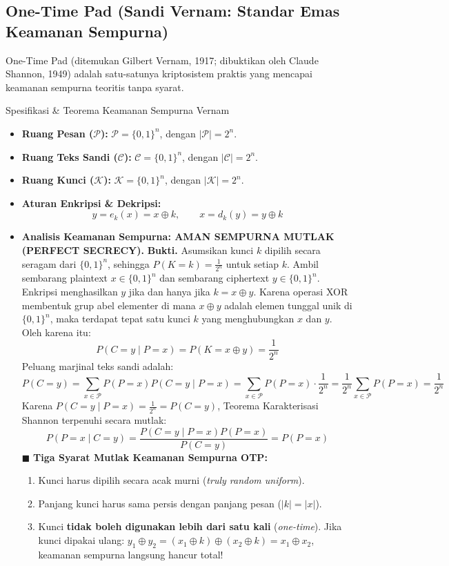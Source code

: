 \documentclass[11pt,a4paper]{article}
\newenvironment{proof}{\noindent\textbf{Bukti.}}{\hfill$\blacksquare$\vspace{0.3em}}
\begin{document}
\subsection{One-Time Pad (Sandi Vernam: Standar Emas Keamanan Sempurna)}
One-Time Pad (ditemukan Gilbert Vernam, 1917; dibuktikan oleh Claude Shannon, 1949) adalah satu-satunya kriptosistem praktis yang mencapai keamanan sempurna teoritis tanpa syarat.
\begin{thmbox}{Spesifikasi \& Teorema Keamanan Sempurna Vernam}
\begin{itemize}[leftmargin=*]
    \item \textbf{Ruang Pesan ($\mathcal{P}$):} $\mathcal{P} = \{0, 1\}^n$, dengan $|\mathcal{P}| = 2^n$.
    \item \textbf{Ruang Teks Sandi ($\mathcal{C}$):} $\mathcal{C} = \{0, 1\}^n$, dengan $|\mathcal{C}| = 2^n$.
    \item \textbf{Ruang Kunci ($\mathcal{K}$):} $\mathcal{K} = \{0, 1\}^n$, dengan $|\mathcal{K}| = 2^n$.
    \item \textbf{Aturan Enkripsi \& Dekripsi:}
    \[
    y = e_k(x) = x \oplus k, \qquad x = d_k(y) = y \oplus k
    \]
    \item \textbf{Analisis Keamanan Sempurna: AMAN SEMPURNA MUTLAK (PERFECT SECRECY).}
    \begin{proof}
    Asumsikan kunci $k$ dipilih secara seragam dari $\{0, 1\}^n$, sehingga $P(K = k) = \frac{1}{2^n}$ untuk setiap $k$. Ambil sembarang plaintext $x \in \{0, 1\}^n$ dan sembarang ciphertext $y \in \{0, 1\}^n$. Enkripsi menghasilkan $y$ jika dan hanya jika $k = x \oplus y$. Karena operasi XOR membentuk grup abel elementer di mana $x \oplus y$ adalah elemen tunggal unik di $\{0, 1\}^n$, maka terdapat tepat satu kunci $k$ yang menghubungkan $x$ dan $y$.
    Oleh karena itu:
    \[
    P(C = y \mid P = x) = P(K = x \oplus y) = \frac{1}{2^n}
    \]
    Peluang marjinal teks sandi adalah:
    \[
    P(C = y) = \sum_{x \in \mathcal{P}} P(P = x) P(C = y \mid P = x) = \sum_{x \in \mathcal{P}} P(P = x) \cdot \frac{1}{2^n} = \frac{1}{2^n} \sum_{x \in \mathcal{P}} P(P = x) = \frac{1}{2^n}
    \]
    Karena $P(C = y \mid P = x) = \frac{1}{2^n} = P(C = y)$, Teorema Karakterisasi Shannon terpenuhi secara mutlak:
    \[
    P(P = x \mid C = y) = \frac{P(C = y \mid P = x) P(P = x)}{P(C = y)} = P(P = x)
    \]
    \end{proof}
    \textbf{Tiga Syarat Mutlak Keamanan Sempurna OTP:}
    \begin{enumerate}
        \item Kunci harus dipilih secara acak murni (\textit{truly random uniform}).
        \item Panjang kunci harus sama persis dengan panjang pesan ($|k| = |x|$).
        \item Kunci \textbf{tidak boleh digunakan lebih dari satu kali} (\textit{one-time}). Jika kunci dipakai ulang: $y_1 \oplus y_2 = (x_1 \oplus k) \oplus (x_2 \oplus k) = x_1 \oplus x_2$, keamanan sempurna langsung hancur total!
    \end{enumerate}
\end{itemize}
\end{thmbox}
\end{document}
